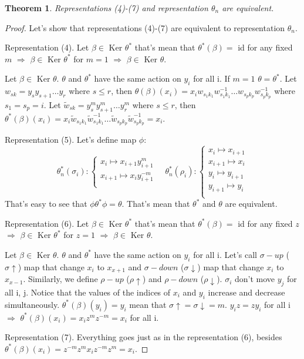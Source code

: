 \documentclass{article}
\newtheorem{theorem}{Theorem}
\begin{document}
\begin{theorem}
Representations (4)-(7) and representation $\theta_n$ are equivalent.
\end{theorem}
\begin{proof}
Let's show that representations (4)-(7) are equivalent to representation $\theta_n$. 

Representation (4). Let $\beta \in$ Ker $\theta^*$ that's mean that $\theta^*(\beta) =$ id for any fixed $m$ $\Rightarrow$ $\beta \in$ Ker $\theta^*$ for $m=1$ $\Rightarrow$ $\beta \in$ Ker $\theta$.

Let $\beta \in$ Ker $\theta$. $\theta$ and $\theta^*$ have the same action on $y_i$ for all i. If $m=1$ $\theta = \theta^*$.
Let $w_{sk} = y_s y_{s+1} \dots y_r$ where $s \leqslant r$, then $\theta(\beta)(x_i) = x_i w_{s_1 k_1}w_{s_1 k_1}^{-1} \dots w_{s_p k_p}w_{s_p k_p}^{-1}$ where $s_1 = s_p = i$.
Let $\tilde w_{s k} = y_s^m y_{s+1}^m \dots y_r^m$ where $s \leqslant r$, then $\theta^*(\beta)(x_i) = x_i \tilde w_{s_1 k_1} \tilde w_{s_1 k_1}^{-1} \dots \tilde w_{s_p k_p} \tilde w_{s_p k_p}^{-1} = x_i$.

Representation (5). Let's define map $\phi$:
\begin{equation}\label{defGV}
\theta_n^*(\sigma_i):
\begin{cases}
x_i \mapsto x_{i+1}y_{i+1}^m\\
x_{i+1} \mapsto x_iy_{i+1}^{-m}\\
\end{cases}\quad
\theta_n^*(\rho_i):
\begin{cases}
x_i \mapsto x_{i+1}\\
x_{i+1} \mapsto x_i\\
y_i \mapsto y_{i+1}\\
y_{i+1} \mapsto y_i\\
\end{cases}
\end{equation}
That's easy to see that $\phi \theta^* \phi = \theta$. That's mean that $\theta^*$ and $\theta$ are equivalent.

Representation (6).  Let $\beta \in$ Ker $\theta^*$ that's mean that $\theta^*(\beta) =$ id for any fixed $z$ $\Rightarrow$ $\beta \in$ Ker $\theta^*$ for $z=1$ $\Rightarrow$ $\beta \in$ Ker $\theta$.

Let $\beta \in$ Ker $\theta$. $\theta$ and $\theta^*$ have the same action on $y_i$ for all i. 
Let's call $\sigma-up$ ($\sigma \uparrow$) map that change $x_i$ to $x_{x+1}$ and $\sigma-down$ ($\sigma \downarrow$) map that change $x_i$ to $x_{x-1}$. Similarly, we define $\rho-up$ ($\rho \uparrow$) and $\rho-down$ ($\rho \downarrow$). $\sigma_i$ don't move $y_j$ for all i, j. Notice that the values of the indices of $x_i$ and $y_i$ increase and decrease simultaneously. $\theta^*(\beta)(y_i) = y_i$ mean that $\sigma \uparrow = \sigma \downarrow = m$. $y_iz = zy_i$ for all i $\Rightarrow$ $\theta^*(\beta)(x_i)= x_i z^m z^{-m} = x_i$ for all i. 

Representation (7). Everything goes just as in the representation (6), besides $\theta^*(\beta)(x_i)= z^{-m}z^m x_i z^{-m} z^m = x_i$.

\end{proof}
\end{document}
